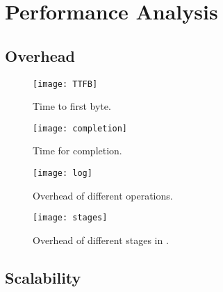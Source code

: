 \section{Performance Analysis}
\label{sec:performance}

\subsection{\system{} Overhead}

\begin{figure}[t!]
\centering
\texttt{[image: TTFB]}
\caption{Time to first byte.}
\label{fig:ttfb}
\end{figure}

\begin{figure}[t!]
\centering
\texttt{[image: completion]}
\caption{Time for completion.}
\label{fig:completion}
\end{figure}

\begin{figure*}[t!]
\centering
\texttt{[image: log]}
\caption{Overhead of different \system{} operations.}
\label{fig:log}
\end{figure*}

\begin{figure*}[t!]
\centering
\texttt{[image: stages]}
\caption{Overhead of different stages in \system{}.}
\label{fig:stages}
\end{figure*}

\subsection{Scalability}
